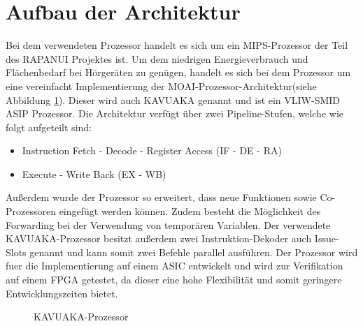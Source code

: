 \section{Aufbau der Architektur}
\label{chap:architecture_overview}
Bei dem verwendeten Prozessor handelt es sich um ein MIPS-Prozessor der Teil des RAPANUI Projektes ist.
Um dem niedrigen Energieverbrauch und Flächenbedarf bei Hörgeräten zu genügen, handelt es sich bei dem Prozessor um eine vereinfacht Implementierung der MOAI-Prozessor-Architektur(siehe Abbildung \ref{fig:KAVUAKA}). Dieser wird auch KAVUAKA genannt und ist ein VLIW-SMID ASIP Prozessor. Die Architektur verfügt über zwei Pipeline-Stufen, welche wie folgt aufgeteilt sind: 
\begin{itemize}
	\item[1.] Instruction Fetch - Decode - Register Access (IF - DE - RA) 
	\item[2.] Execute - Write Back (EX - WB)
\end{itemize}
Außerdem wurde der Prozessor so erweitert, dass neue Funktionen sowie Co-Prozessoren eingefügt werden können. Zudem besteht die Möglichkeit des Forwarding bei der Verwendung von temporären Variablen.
Der verwendete KAVUAKA-Prozessor besitzt außerdem zwei Instruktion-Dekoder auch Issue-Slots genannt und kann somit zwei Befehle parallel ausführen.
 Der Prozessor wird fuer die Implementierung auf einem ASIC entwickelt und wird zur Verifikation auf einem FPGA getestet, da dieser eine hohe Flexibilität und somit geringere Entwicklungszeiten bietet.\cite{lukasglitches2017}

\begin{scriptsize}
	\begin{figure}[htbp] 
		\centering
		
		\caption{KAVUAKA-Prozessor \cite{lukasglitches2017}}
		\label{fig:KAVUAKA}
	\end{figure}
\end{scriptsize}


